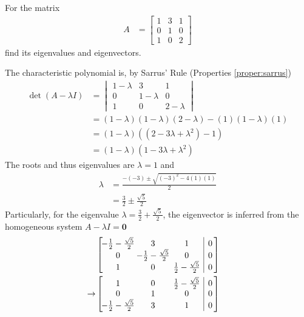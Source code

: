 \begin{exmp}
\label{exmp:eigenfull}
For the matrix
\begin{align*}
A &= 
\begin{bmatrix}
1 & 3 & 1 \\
0 & 1 & 0 \\
1 & 0 & 2
\end{bmatrix}
\end{align*}
find its eigenvalues and eigenvectors.
\end{exmp}
\begin{solution}
The characteristic polynomial is, by Sarrus' Rule (Properties \ref{proper:sarrus})
\begin{align*}
\det(A-\lambda I) &= \begin{vmatrix}
1-\lambda & 3 & 1 \\
0 & 1-\lambda & 0 \\
1 & 0 & 2-\lambda 
\end{vmatrix} \\
&=
(1-\lambda)(1-\lambda)(2-\lambda) - (1)(1-\lambda)(1) \\
&= (1-\lambda)((2-3\lambda+\lambda^2) - 1) \\
&= (1-\lambda)(1-3\lambda+\lambda^2)
\end{align*}
The roots and thus eigenvalues are $\lambda = 1$ and
\begin{align*}
\lambda &= \frac{-(-3) \pm \sqrt{(-3)^2 - 4(1)(1)}}{2} \\
&= \frac{3}{2} \pm \frac{\sqrt{5}}{2}
\end{align*}
Particularly, for the eigenvalue $\lambda = \frac{3}{2} + \frac{\sqrt{5}}{2}$, the eigenvector is inferred from the homogeneous system $A - \lambda I = \textbf{0}$
\begin{align*}
& \left[\begin{array}{@{\,}wc{33pt}wc{30pt}wc{30pt}|c@{\,}}
-\frac{1}{2}-\frac{\sqrt{5}}{2} & 3 & 1 & 0 \\
0 & -\frac{1}{2}-\frac{\sqrt{5}}{2} & 0 & 0 \\
1 & 0 & \frac{1}{2}-\frac{\sqrt{5}}{2} & 0
\end{array}\right] \\
\to&
\left[\begin{array}{@{\,}wc{33pt}wc{30pt}wc{30pt}|c@{\,}}
1 & 0 & \frac{1}{2}-\frac{\sqrt{5}}{2} & 0 \\
0 & 1 & 0 & 0 \\
-\frac{1}{2}-\frac{\sqrt{5}}{2} & 3 & 1 & 0
\end{array}\right] & \begin{aligned}

\end{aligned}
\end{align*}
\end{solution}
